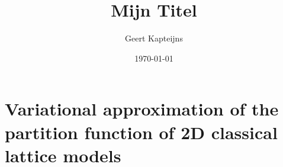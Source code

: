 \documentclass[10pt, ebook, openany, oneside]{memoir}
\begin{document}
\pagestyle{simple}



\frontmatter

\title{Mijn Titel}
\author{Geert Kapteijns}
\date{\today}


\tableofcontents

\mainmatter

\chapter{Variational approximation of the partition function of 2D classical lattice models}


%



%


\backmatter
\printbibliography
\end{document}
